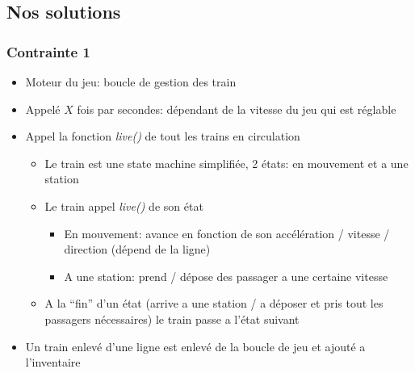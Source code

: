 \documentclass[report, backcover, french, nodocumentinfo]{upmethodology-document}
\begin{document}
			\subsection{Nos solutions}
				\subsubsection{Contrainte 1}
					\begin{itemize}
						\item Moteur du jeu: boucle de gestion des train
						\item Appelé $X$ fois par secondes: dépendant de la vitesse du jeu qui est réglable
						\item Appel la fonction \textit{live()} de tout les trains en circulation
							\begin{itemize}
								\item Le train est une state machine simplifiée, 2 états: en mouvement et a une station
								\item Le train appel \textit{live()} de son état
									\begin{itemize}
										\item En mouvement: avance en fonction de son accélération / vitesse / direction (dépend de la ligne)
										\item A une station: prend / dépose des passager a une certaine vitesse
									\end{itemize}
								\item A la ``fin'' d'un état (arrive a une station / a déposer et pris tout les passagers nécessaires) le train passe a l'état suivant
							\end{itemize}
						\item Un train enlevé d'une ligne est enlevé de la boucle de jeu et ajouté a l'inventaire
					\end{itemize}
\end{document}
